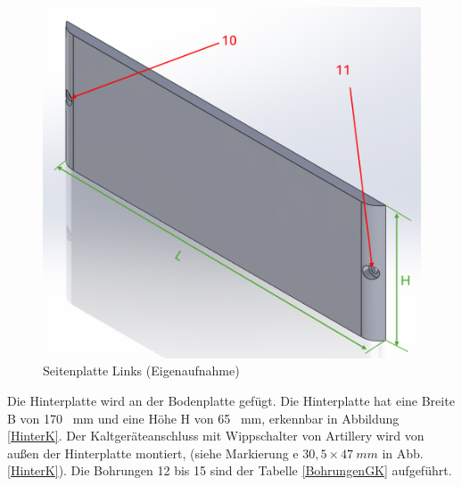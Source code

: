 \begin{figure}[H]
	\begin{center}
		\includegraphics[width=\textwidth]{Images/Konstruktion/SeiteLK.png}
		\caption{Seitenplatte Links (Eigenaufnahme)} \label{SeiteLK}
	\end{center}
\end{figure}

Die Hinterplatte wird an der Bodenplatte gefügt. Die Hinterplatte hat eine Breite B von 170 \ mm und eine Höhe H von 65 \ mm, erkennbar in Abbildung \ref{HinterK}. Der Kaltgeräteanschluss mit Wippschalter von Artillery wird von außen der Hinterplatte montiert, (siehe Markierung e $30,5 \times 47 \ mm$  in Abb.\ref{HinterK}). Die Bohrungen 12 bis 15 sind der Tabelle \ref{BohrungenGK} aufgeführt.

